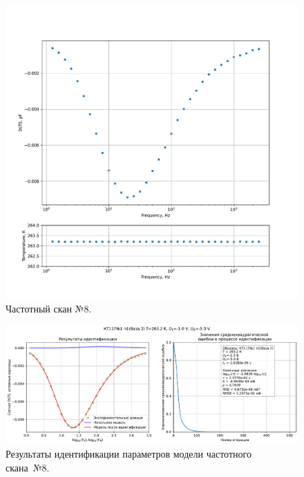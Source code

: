 \begin{figure}[!ht]
    \centering
    \includegraphics[width=1\textwidth]{../plots/КТ117№1_п1(база 2)_2500Гц-1Гц_1пФ_-10С_-1В-5В_200мВ_20мкс_шаг_0,1.pdf}
    \caption{Частотный скан №8.}
    \label{pic:frequency_scan_8}
\end{figure}

\begin{figure}[!ht]
    \centering
    \includegraphics[width=1\textwidth]{../plots/КТ117№1_п1(база 2)_2500Гц-1Гц_1пФ_-10С_-1В-5В_200мВ_20мкс_шаг_0,1_model.pdf}
    \caption{Результаты идентификации параметров модели частотного скана~№8.}
    \label{pic:frequency_scan_model8}
\end{figure}

\pagebreak



